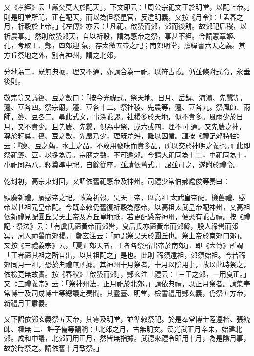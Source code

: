 \begin{pinyinscope}
 又《孝經》云「嚴父莫大於配天」，下文即云：「周公宗祀文王於明堂，以配上帝。」則是明堂所祀，正在配天，而以為但祭星官，反違明義。又按《月令》：「孟春之月，祈穀於上帝。」《左傳》亦云：「凡祀，啟蟄而郊，郊而後耕。故郊祀后稷，以祈農事。」然則啟蟄郊天，自以祈穀，謂為感帝之祭，事甚不經。今請憲章姬、孔，考取王、鄭，四郊迎
 氣，存太微五帝之祀；南郊明堂，廢緯書六天之義。其方丘祭地之外，別有神州，謂之北郊，



 分地為二，既無典據，理又不通，亦請合為一祀，以符古義。仍並條附式令，永垂後則。



 敬宗等又議籩、豆之數曰：「按今光祿式，祭天地、日月、岳鎮、海瀆、先蠶等，籩、豆各四。祭宗廟，籩、豆各十二。祭社稷、先農等，籩、豆各九。祭風師、雨師，籩、豆各二。尋此式文，事深乖謬。社稷多於天地，似不貴多。風雨少於日月，又不貴少。且先農、先蠶，俱為中祭，或六或四，理不可
 通。又先農之神，尊於釋奠，籩、豆之數，先農乃少，理既差舛，難以因循。謹按《禮記郊特牲》云：『籩、豆之薦，水土之品，不敢用褻味而貴多品，所以交於神明之義也。』此即祭祀籩、豆，以多為貴。宗廟之數，不可逾郊。今請大祀同為十二，中祀同為十，小祀同為八，釋奠準中祀。自餘從座，並請依舊式。」詔並可之，遂附於禮令。



 乾封初，高宗東封回，又詔依舊祀感帝及神州。司禮少常伯郝處俊等奏曰：



 顯慶新禮，廢感帝之祀，改為祈穀。昊天上帝，以高祖
 太武皇帝配。檢舊禮，感帝以世祖元皇帝配。今既奉敕仍舊復祈穀為感帝，以高祖太武皇帝配神州，又高祖依新禮見配圓丘昊天上帝及方丘皇地祇，若更配感帝神州，便恐有乖古禮。按《禮記·祭法》云：「有虞氏禘黃帝而郊嚳，夏后氏亦禘黃帝而郊鯀，殷人禘嚳而郊冥，周人禘嚳而郊稷。」鄭玄注云：「禘謂祭昊天於圓丘也。祭上帝於南郊曰郊」。又按《三禮義宗》云，「夏正郊天者，王者各祭所出帝於南郊」，即《大傳》所謂「王者禘其祖之所自出，以其祖配之」是也。此則
 禘須遠祖，郊須始祖。今若禘郊同用一祖，恐於典禮無所據。其神州十月祭者，十月以陰用事，故以此時祭之，依檢更無故實。按《春秋》「啟蟄而郊」，鄭玄注「禮云：「三王之郊，一用夏正。」又《三禮義宗》云：「祭神州法，正月祀於北郊。」請依典禮，以正月祭者。請集奉常博士及司成博士等總議定奏聞。其靈臺、明堂，檢書禮用鄭玄義，仍祭五方帝，新禮用王肅義。



 又下詔依鄭玄義祭五天帝，其雩及明堂，並準敕祭祀。於是奉常博士陸遵楷、張統師、權無
 二、許子儒等議稱：「北郊之月，古無明文。漢光武正月辛未，始建北郊。咸和中議，北郊同用正月，然皆無指據。武德來禮令即用十月，為是陰用事，故於時祭之。請依舊十月致祭。」




\end{pinyinscope}
